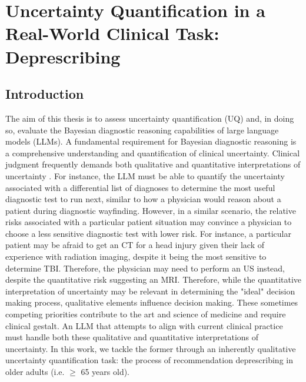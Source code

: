 \chapter{Uncertainty Quantification in a Real-World Clinical Task: Deprescribing} \label{chapter:deprescribing}

\section{Introduction}
The aim of this thesis is to assess uncertainty quantification (UQ) and, in doing so, evaluate the Bayesian diagnostic reasoning capabilities of large language models (LLMs). A fundamental requirement for Bayesian diagnostic reasoning is a comprehensive understanding and quantification of clinical uncertainty. Clinical judgment frequently demands both qualitative and quantitative interpretations of uncertainty \cite{feinsteinClinicalJudgmentRevisited1994a}. For instance, the LLM must be able to quantify the uncertainty associated with a differential list of diagnoses to determine the most useful diagnostic test to run next, similar to how a physician would reason about a patient during diagnostic wayfinding. However, in a similar scenario, the relative risks associated with a particular patient situation may convince a physician to choose a less sensitive diagnostic test with lower risk. For instance, a particular patient may be afraid to get an CT for a head injury given their lack of experience with radiation imaging, despite it being the most sensitive to determine TBI. Therefore, the physician may need to perform an US instead, despite the quantitative risk suggesting an MRI. Therefore, while the quantitative interpretation of uncertainty may be relevant in determining the "ideal" decision making process, qualitative elements influence decision making. These sometimes competing priorities contribute to the art and science of medicine and require clinical gestalt. An LLM that attempts to align with current clinical practice must handle both these qualitative and quantitative interpretations of uncertainty. In this work, we tackle the former through an inherently qualitative uncertainty quantification task: the process of recommendation deprescribing in older adults (i.e. $\geq$ 65 years old). 

